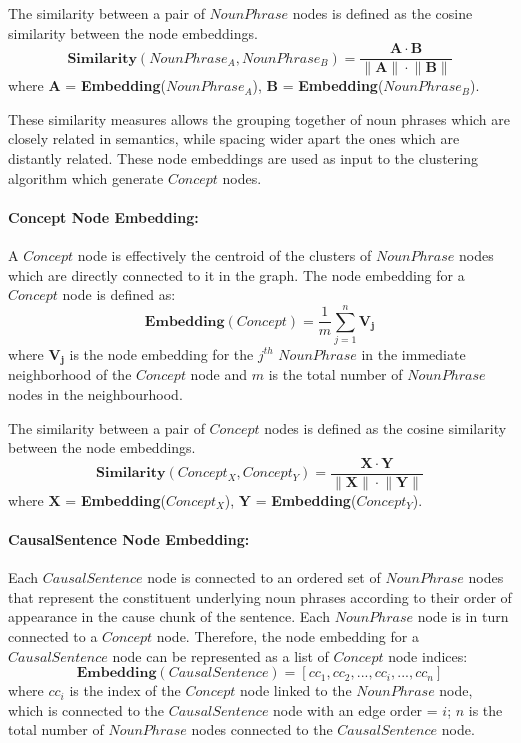 \documentclass [
     12pt,         %
     a4paper,      %
     BCOR10mm,     %
     DIV14,        %
     liststotoc,   %
     bibtotoc,     %
     idxtotoc,     %
     parskip       %
     ]{scrreprt}
\begin{document}
The similarity between a pair of $NounPhrase$ nodes is defined as the cosine similarity between the node embeddings. 
\[ \mathbf{Similarity}(NounPhrase_A, NounPhrase_B) = \frac{\mathbf{A \cdot B} } {\mathbf{\lVert A \rVert \cdot \lVert B \rVert}} \]  where $\mathbf{A}$ = \textbf{Embedding}($NounPhrase_A$), $\mathbf{B}$ = \textbf{Embedding}($NounPhrase_B$).

These similarity measures allows the grouping together of noun phrases which are closely related in semantics, while spacing wider apart the ones which are distantly related. These node embeddings are used as input to the clustering algorithm which generate $Concept$ nodes.

\paragraph{Concept Node Embedding:} A $Concept$ node is effectively the centroid of the clusters of $NounPhrase$ nodes which are directly connected to it in the graph. The node embedding for a $Concept$ node is defined as:
\[ \mathbf{Embedding}(Concept) = \frac{1}{m} \sum_{j=1} ^n {\mathbf{V_j}}\] 
where $\mathbf{V_j}$ is the node embedding for the $j^{th}$ $NounPhrase$ in the immediate neighborhood of the $Concept$ node and $m$ is the total number of $NounPhrase$ nodes in the neighbourhood. 

The similarity between a pair of $Concept$ nodes is defined as the cosine similarity between the node embeddings. 
\[ \mathbf{Similarity}(Concept_X, Concept_Y) = \frac{\mathbf{X \cdot Y} } {\mathbf{\lVert X \rVert \cdot \lVert Y \rVert}} \]  where $\mathbf{X}$ = \textbf{Embedding}($Concept_X$), $\mathbf{Y}$ = \textbf{Embedding}($Concept_Y$).


\paragraph{CausalSentence Node Embedding:} Each $CausalSentence$ node is connected to an ordered set of $NounPhrase$ nodes that represent the constituent underlying noun phrases according to their order of appearance in the cause chunk of the sentence. Each $NounPhrase$ node is in turn connected to a $Concept$ node. Therefore, the node embedding for a $CausalSentence$ node can be represented as a list of $Concept$ node indices: 
\[ \mathbf{Embedding}(CausalSentence) = [cc_1, cc_2, ..., cc_i, ..., cc_n] \]
where $cc_i$ is the index of the $Concept$ node linked to the $NounPhrase$ node, which is connected to the $CausalSentence$ node with an edge order = $i$; $n$ is the total number of $NounPhrase$ nodes connected to the $CausalSentence$ node. 
\end{document}
